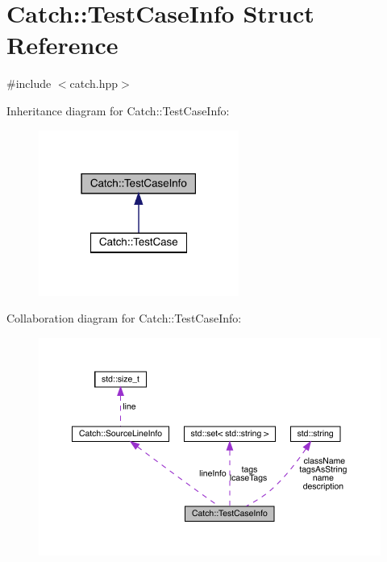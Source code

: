 \hypertarget{struct_catch_1_1_test_case_info}{}\section{Catch\+:\+:Test\+Case\+Info Struct Reference}
\label{struct_catch_1_1_test_case_info}


{\ttfamily \#include $<$catch.\+hpp$>$}



Inheritance diagram for Catch\+:\+:Test\+Case\+Info\+:
\nopagebreak
\begin{figure}[H]
\begin{center}
\leavevmode
\includegraphics[width=186pt]{struct_catch_1_1_test_case_info__inherit__graph}
\end{center}
\end{figure}


Collaboration diagram for Catch\+:\+:Test\+Case\+Info\+:
\nopagebreak
\begin{figure}[H]
\begin{center}
\leavevmode
\includegraphics[width=350pt]{struct_catch_1_1_test_case_info__coll__graph}
\end{center}
\end{figure}
